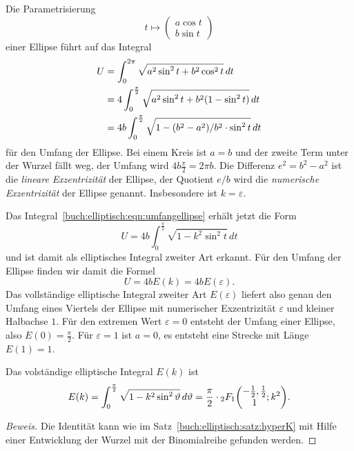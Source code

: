 Die Parametrisierung
\[
t\mapsto \begin{pmatrix}a\cos t\\ b\sin t\end{pmatrix}
\]
einer Ellipse führt auf das Integral
\begin{align}
U
&=
\int_0^{2\pi} \sqrt{a^2\sin^2t + b^2\cos^2 t}\,dt
\notag
\\
&=
4\int_0^{\frac{\pi}2}
\sqrt{a^2\sin^2t + b^2(1-\sin^2 t)}
\,dt
\notag
\\
&=
4b \int_0^{\frac{\pi}2} \sqrt{1-(b^2-a^2)/b^2\cdot \sin^2t}\,dt
\label{buch:elliptisch:eqn:umfangellipse}
\end{align}
für den Umfang der Ellipse.
Bei einem Kreis ist $a=b$ und der zweite Term unter der Wurzel fällt weg,
der Umfang wird $4b\frac{\pi}2=2\pi b$.
Die Differenz $e^2=b^2-a^2$ ist die {\em lineare Exzentrizität} der Ellipse,
%
der Quotient $e/b$ wird die {\em numerische Exzentrizität} der Ellipse
genannt.
Insbesondere ist $k = \varepsilon$.

Das Integral~\eqref{buch:elliptisch:eqn:umfangellipse} erhält jetzt die
Form
\[
U
=
4b\int_0^{\frac{\pi}2} \sqrt{1-k^2\sin^2t}\,dt
\]
und ist damit als elliptisches Integral zweiter Art erkannt.
Für den Umfang der Ellipse finden wir damit die Formel
\[
U
=
4b E(k)
=
4b E(\varepsilon).
\]
Das vollständige elliptische Integral zweiter Art $E(\varepsilon)$
liefert also genau den Umfang eines Viertels der Ellipse mit
numerischer Exzentrizität $\varepsilon$ und kleiner Halbachse $1$.
Für den extremen Wert $\varepsilon=0$ entsteht der Umfang einer Ellipse,
also $E(0)=\frac{\pi}2$.
Für $\varepsilon=1$ ist $a=0$, es entsteht eine Strecke mit Länge $E(1)=1$.

\begin{satz}
\label{buch:elliptisch:satz:hyperE}
Das volständige elliptische Integral $E(k)$ ist
\[
E(k)
=
\int_0^{\frac{\pi}2} \sqrt{1-k^2\sin^2\vartheta}\,d\vartheta
=
\frac{\pi}2
\cdot
\mathstrut_2F_1\biggl(
\begin{matrix}-\frac12,\frac12\\1\end{matrix};
k^2
\biggr).
\]
\end{satz}

\begin{proof}[Beweis]
Die Identität kann wie im Satz~\ref{buch:elliptisch:satz:hyperK} mit
Hilfe einer Entwicklung der Wurzel mit der Binomialreihe gefunden
werden.
\end{proof}

